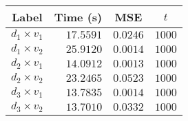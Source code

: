 \begin{tabular}{lrrr}
  \toprule
  \multicolumn{1}{c}{Label} & \multicolumn{1}{c}{Time (s)} & \multicolumn{1}{c}{MSE} & \multicolumn{1}{c}{$t$} \\
  \midrule
   $d_1 \times v_1$ &                    $17.5591$ &                $0.0246$ &                  $1000$ \\
   $d_1 \times v_2$ &                    $25.9120$ &                $0.0014$ &                  $1000$ \\
   $d_2 \times v_1$ &                    $14.0912$ &                $0.0013$ &                  $1000$ \\
   $d_2 \times v_2$ &                    $23.2465$ &                $0.0523$ &                  $1000$ \\
   $d_3 \times v_1$ &                    $13.7835$ &                $0.0014$ &                  $1000$ \\
   $d_3 \times v_2$ &                    $13.7010$ &                $0.0332$ &                  $1000$ \\
\bottomrule
\end{tabular}
